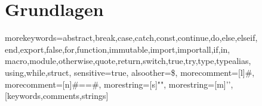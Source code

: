 \chapter{Grundlagen} \label{ch:grundlagen}

%
  {morekeywords={abstract,break,case,catch,const,continue,do,else,elseif,%
      end,export,false,for,function,immutable,import,importall,if,in,%
      macro,module,otherwise,quote,return,switch,true,try,type,typealias,%
      using,while,struct},%
   sensitive=true,%
   alsoother={\$},%
   morecomment=[l]#,%
   morecomment=[n]{#=}{=#},%
   morestring=[s]{"}{"},%
   morestring=[m]{'}{'},%
}[keywords,comments,strings]%

















